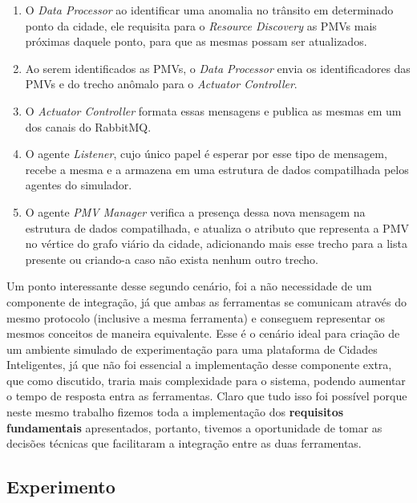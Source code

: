 \begin{enumerate}
    \item O \textit{Data Processor} ao identificar uma anomalia no trânsito em determinado ponto da cidade, ele requisita para o \textit{Resource Discovery} as PMVs mais próximas
        daquele ponto, para que as mesmas possam ser atualizados.

    \item Ao serem identificados as PMVs, o \textit{Data Processor} envia os identificadores das PMVs e do trecho anômalo para o \textit{Actuator Controller}.

    \item O \textit{Actuator Controller} formata essas mensagens e publica as mesmas em um dos canais do RabbitMQ.

    \item O agente \textit{Listener}, cujo único papel é esperar por esse tipo de mensagem, recebe a mesma e a armazena em uma estrutura de dados compatilhada pelos agentes do simulador.

    \item O agente \textit{PMV Manager} verifica a presença dessa nova mensagem na estrutura de dados compatilhada, e atualiza o atributo que representa a PMV no vértice do grafo
        viário da cidade, adicionando mais esse trecho para a lista presente ou criando-a caso não exista nenhum outro trecho.
\end{enumerate}

Um ponto interessante desse segundo cenário, foi a não necessidade de um componente de integração, já que ambas as ferramentas se comunicam através do mesmo protocolo (inclusive a
mesma ferramenta) e conseguem representar os mesmos conceitos de maneira equivalente.
Esse é o cenário ideal para criação de um ambiente simulado de experimentação para uma plataforma de Cidades Inteligentes, já que não foi essencial a implementação desse
componente extra, que como discutido, traria mais complexidade para o sistema, podendo aumentar o tempo de resposta entra as ferramentas.
Claro que tudo isso foi possível porque neste mesmo trabalho fizemos toda a implementação dos \textbf{requisitos fundamentais} apresentados, portanto,
tivemos a oportunidade de tomar as decisões técnicas que facilitaram a integração entre as duas ferramentas.


\subsection{Experimento}

